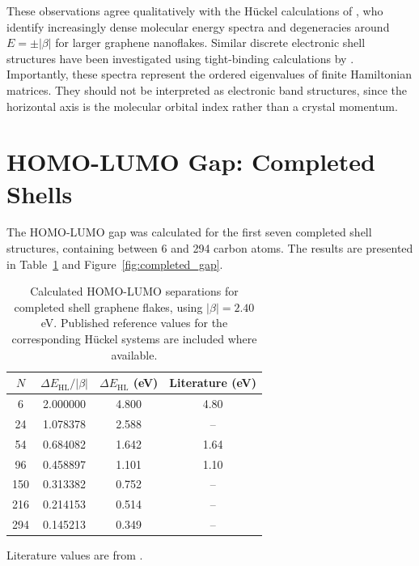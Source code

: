 \noindent These observations agree qualitatively with the H\"uckel calculations of \textcite{jeongCalculationElectronicStructures2024}, who identify increasingly dense molecular energy spectra and degeneracies around $E=\pm|\beta|$ for larger graphene nanoflakes. Similar discrete electronic shell structures have been investigated using tight-binding calculations by \textcite{heiskanen_electronic_2008}. \\

\noindent Importantly, these spectra represent the ordered eigenvalues of finite Hamiltonian matrices. They should not be interpreted as electronic band structures, since the horizontal axis is the molecular orbital index rather than a crystal momentum.



\section{HOMO-LUMO Gap: Completed Shells}
\label{sec:results_gap}

The HOMO-LUMO gap was calculated for the first seven completed shell structures, containing between 6 and 294 carbon atoms. The results are presented in Table~\ref{tab:completed_gap} and Figure~\ref{fig:completed_gap}. \\

\begin{table}[h!]
    \centering
    \caption{Calculated HOMO-LUMO separations for completed shell graphene flakes, using $|\beta|=2.40$ eV. Published reference values for the corresponding H\"uckel systems are included where available.}
    \label{tab:completed_gap}
    \begin{tabular}{c c c c}
        \hline
        $N$ & $\Delta E_{\mathrm{HL}}/|\beta|$
        & $\Delta E_{\mathrm{HL}}$ (eV)
        & Literature (eV) \\
        \hline
        6   & 2.000000 & 4.800 & 4.80 \\
        24  & 1.078378 & 2.588 & -- \\
        54  & 0.684082 & 1.642 & 1.64 \\
        96  & 0.458897 & 1.101 & 1.10 \\
        150 & 0.313382 & 0.752 & -- \\
        216 & 0.214153 & 0.514 & -- \\
        294 & 0.145213 & 0.349 & -- \\
        \hline
    \end{tabular}

    \vspace{2mm}
    \footnotesize
    Literature values are from
    \textcite{jeongCalculationElectronicStructures2024}.
\end{table}

